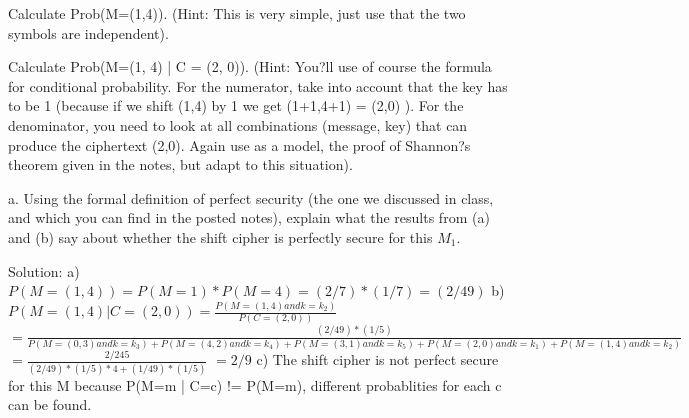 \documentclass[12pt,letterpaper,final]{report}
\begin{document}
\bigskip
{}
\begin{alphalist}
	\item Calculate Prob(M=(1,4)). (Hint: This is very simple, just use that the two symbols are independent).
	\item Calculate Prob(M=(1, 4) | C = (2, 0)). (Hint: You?ll use of course the formula for conditional probability. For the numerator, take into account that the key has to be 1 (because if we shift (1,4) by 1 we get (1+1,4+1) = (2,0) ). For the denominator, you need to look at all combinations (message, key) that can produce the ciphertext (2,0).  Again use as a model, the proof of Shannon?s theorem given in the notes, but adapt to this situation).
	\item a.	Using the formal definition of perfect security (the one we discussed in class, and which you can find in the posted notes), explain what the results from (a) and (b) say about whether the shift cipher is perfectly secure for this $M_{1}$.
\end{alphalist}


\bigskip Solution: 
\newline a) $P(M=(1,4)) = P(M=1) * P(M=4) = (2/7)*(1/7) = (2/49)$
\newline b)
\newline $P(M=(1,4) | C=(2,0)) = \frac{P(M=(1,4) and k=k_2)}{P(C=(2,0))}$
\newline $=\frac{(2/49)*(1/5)}{P(M=(0,3) and k=k_3) + P(M=(4,2) and k=k_4) + P(M=(3,1) and k=k_5) + P(M=(2,0) and k=k_1) + P(M=(1,4) and k=k_2)}$
\newline $=\frac{2/245}{(2/49)*(1/5)*4 + (1/49)*(1/5)}$
\newline $=2/9$
\newline\newline c) The shift cipher is not perfect secure for this M because P(M=m | C=c) != P(M=m), different probablities for each c can be found.
\bigskip
\end{document}
